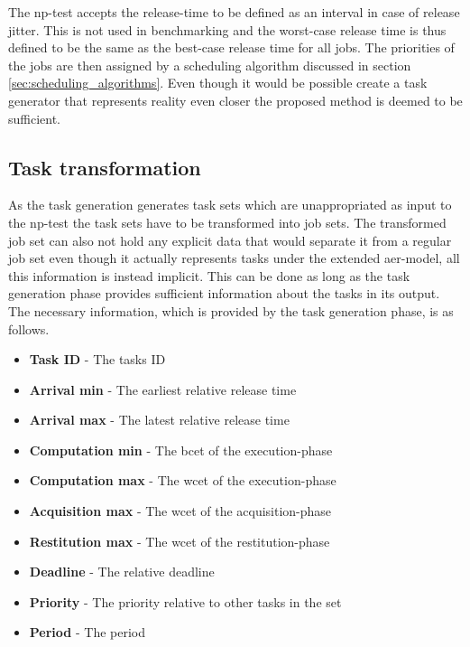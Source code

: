 \documentclass{kththesis}
\begin{document}

The \acrshort{np}-test accepts the release-time to be defined as an interval in case of release
jitter. This is not used in benchmarking and the worst-case release time is thus defined to be
the same as the best-case release time for all jobs. The priorities of the jobs are then
assigned by a scheduling algorithm discussed in section \ref{sec:scheduling_algorithms}. Even though
it would be possible create a task generator that represents reality even closer the proposed method
is deemed to be sufficient.


\subsection{Task transformation} \label{sub:task_transformation}

As the task generation generates task sets which are unappropriated as input to the
\acrshort{np}-test the task sets have to be transformed into job sets. The transformed job set can also not hold any
explicit data that would separate it from a regular job set even though it actually represents tasks
under the extended \acrshort{aer}-model, all this information is instead implicit. This can be done as long
as the task generation phase provides sufficient information about the tasks in its output. The
necessary information, which is provided by the task generation phase, is as follows.

\begin{itemize}
    \item \textbf{Task ID} - The tasks ID
    \item \textbf{Arrival min} - The earliest relative release time
    \item \textbf{Arrival max} - The latest relative release time
    \item \textbf{Computation min} - The \acrshort{bcet} of the execution-phase
    \item \textbf{Computation max} - The \acrshort{wcet} of the execution-phase
    \item \textbf{Acquisition max} - The \acrshort{wcet} of the acquisition-phase
    \item \textbf{Restitution max} - The \acrshort{wcet} of the restitution-phase
    \item \textbf{Deadline} - The relative deadline
    \item \textbf{Priority} - The priority relative to other tasks in the set
    \item \textbf{Period} - The period 
\end{itemize}
\end{document}

